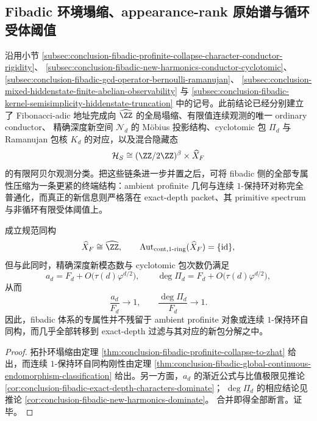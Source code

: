 \subsection{Fibadic 环境塌缩、appearance-rank 原始谱与循环受体阈值}\label{subsec:conclusion-fibadic-packet-primitive-spectrum-cyclic-threshold}
沿用小节 \ref{subsec:conclusion-fibadic-profinite-collapse-character-conductor-rigidity}、
\ref{subsec:conclusion-fibadic-new-harmonics-conductor-cyclotomic}、
\ref{subsec:conclusion-fibadic-gcd-operator-bernoulli-ramanujan}、
\ref{subsec:conclusion-mixed-hiddenstate-finite-abelian-observability}
与
\ref{subsec:conclusion-fibadic-kernel-semisimplicity-hiddenstate-truncation}
中的记号。此前结论已经分别建立了 Fibonacci-adic 地址完成向
\(\widehat{\ZZ}\) 的全局塌缩、有限值连续观测的唯一 ordinary conductor、
精确深度新空间 \(\mathcal N_d\) 的 Möbius 投影结构、cyclotomic 包
\(\Pi_d\) 与 Ramanujan 包核 \(K_d\) 的对应，以及混合隐藏态
\[
\mathcal H_S\cong (\ZZ/2\ZZ)^\beta\times \widehat X_F
\]
的有限阿贝尔观测分类。把这些链条进一步并置之后，可将 fibadic 侧的全部专属性压缩为一条更紧的终端结构：ambient profinite 几何与连续 \(1\)-保持环对称完全普通化，而真正的新信息则严格落在 exact-depth packet、其 primitive spectrum 与非循环有限受体阈值上。

\begin{theorem}[环境塌缩与精确深度模态饱和的并存]\label{thm:conclusion-fibadic-collapse-packet-saturation-coexistence}
成立规范同构
\[
\widehat X_F\cong \widehat{\ZZ},
\qquad
\operatorname{Aut}_{\mathrm{cont},1\text{-ring}}(\widehat X_F)=\{\mathrm{id}\},
\]
但与此同时，精确深度新模态数与 cyclotomic 包次数仍满足
\[
a_d=F_d+O\!\bigl(\tau(d)\varphi^{d/2}\bigr),
\qquad
\deg \Pi_d=F_d+O\!\bigl(\tau(d)\varphi^{d/2}\bigr),
\]
从而
\[
\frac{a_d}{F_d}\longrightarrow 1,
\qquad
\frac{\deg \Pi_d}{F_d}\longrightarrow 1.
\]
因此，fibadic 体系的专属性并不残留于 ambient profinite 对象或连续 \(1\)-保持环自同构，而几乎全部转移到 exact-depth 过滤与其对应的新包分解之中。
\end{theorem}
\begin{proof}
拓扑环塌缩由定理
\ref{thm:conclusion-fibadic-profinite-collapse-to-zhat}
给出，而连续 \(1\)-保持环自同构刚性由定理
\ref{thm:conclusion-fibadic-global-continuous-endomorphism-classification}
给出。另一方面，\(a_d\) 的渐近公式与比值极限见推论
\ref{cor:conclusion-fibadic-exact-depth-characters-dominate}；
\(\deg\Pi_d\) 的相应结论见推论
\ref{cor:conclusion-fibadic-new-harmonics-dominate}。
合并即得全部断言。证毕。
\end{proof}

